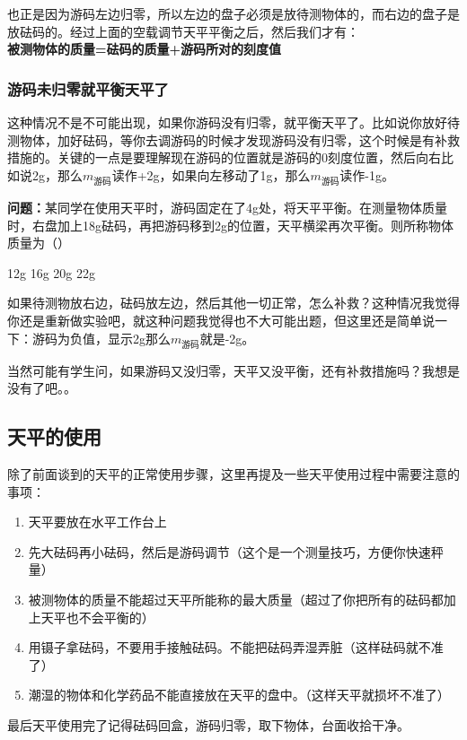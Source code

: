 \documentclass[12pt,twoside]{exam}
\begin{document}
\begin{knowledge}
也正是因为游码左边归零，所以左边的盘子必须是放待测物体的，而右边的盘子是放砝码的。经过上面的空载调节天平平衡之后，然后我们才有：\\
\textbf{被测物体的质量=砝码的质量+游码所对的刻度值}

\subsubsection{游码未归零就平衡天平了}
这种情况不是不可能出现，如果你游码没有归零，就平衡天平了。比如说你放好待测物体，加好砝码，等你去调游码的时候才发现游码没有归零，这个时候是有补救措施的。关键的一点是要理解现在游码的位置就是游码的0刻度位置，然后向右比如说2g，那么$m_\textrm{游码}$读作+2g，如果向左移动了1g，那么$m_\textrm{游码}$读作-1g。

\textbf{问题：}某同学在使用天平时，游码固定在了4g处，将天平平衡。在测量物体质量时，右盘加上18g砝码，再把游码移到2g的位置，天平横梁再次平衡。则所称物体质量为（\answerline*[B]）

\begin{oneparchoices}
\choice 12g
\choice 16g
\choice 20g
\choice 22g
\end{oneparchoices}

\pagebreak
如果待测物放右边，砝码放左边，然后其他一切正常，怎么补救？这种情况我觉得你还是重新做实验吧，就这种问题我觉得也不大可能出题，但这里还是简单说一下：游码为负值，显示2g那么$m_\textrm{游码}$就是-2g。

当然可能有学生问，如果游码又没归零，天平又没平衡，还有补救措施吗？我想是没有了吧。。


\subsection{天平的使用}
除了前面谈到的天平的正常使用步骤，这里再提及一些天平使用过程中需要注意的事项：
\begin{enumerate}
\item 天平要放在水平工作台上
\item 先大砝码再小砝码，然后是游码调节（这个是一个测量技巧，方便你快速秤量）
\item 被测物体的质量不能超过天平所能称的最大质量（超过了你把所有的砝码都加上天平也不会平衡的）
\item 用镊子拿砝码，不要用手接触砝码。不能把砝码弄湿弄脏（这样砝码就不准了）
\item 潮湿的物体和化学药品不能直接放在天平的盘中。（这样天平就损坏不准了）
\end{enumerate}

最后天平使用完了记得砝码回盒，游码归零，取下物体，台面收拾干净。


\end{knowledge}
\end{document}
